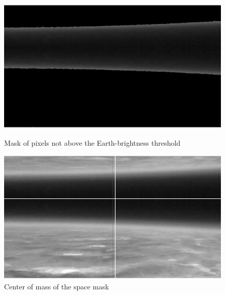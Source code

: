 \documentclass[10pt]{article}
\begin{document}
\begin{figure}[h]
        \begin{minipage}{.45\textwidth}
            \centering
                \includegraphics[width=\linewidth]{../plots_tables_images/spacemask.eps}
                \caption{Mask of pixels not above the Earth-brightness threshold}
        \end{minipage}
        \hspace{.5in}
        \begin{minipage}{.45\textwidth}
            \centering
                \includegraphics[width=\linewidth]{../plots_tables_images/spreadc.eps}
                \caption{Center of mass of the space mask}
        \end{minipage}
    \end{figure}
\end{document}
